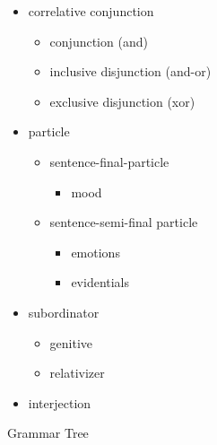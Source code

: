 \begin{table}
\begin{multicols}{2}
\begin{itemize}
\item correlative conjunction
    \begin{itemize}
        \item conjunction (and)
        \item inclusive disjunction (and-or)
        \item exclusive disjunction (xor)
    \end{itemize}

\item particle
    \begin{itemize}
    \item  sentence-final-particle
        \begin{itemize}
            \item mood
        \end{itemize}
    \item sentence-semi-final particle
        \begin{itemize}
            \item emotions
            \item evidentials
        \end{itemize}
    \end{itemize}

\item subordinator
    \begin{itemize}
        \item genitive
        \item relativizer
    \end{itemize}

\item interjection
\end{itemize}
\end{multicols}
\caption{Grammar Tree}
\end{table}

